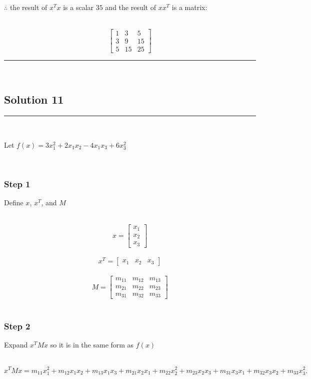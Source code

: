 \documentclass{article}
\begin{document}
\vspace{0.5cm}

\parbox{\textwidth}{$\therefore$ the result of $x^{T}x$ is a scalar $35$ and the result of $xx^{T}$ is a matrix:}\\
$$\begin{bmatrix} 1 & 3 & 5 \\ 3 & 9 & 15 \\ 5 & 15 & 25 \end{bmatrix}$$

\noindent\rule{\textwidth}{0.4pt}\\
\newpage

\subsection*{Solution 11}

\noindent\rule{\textwidth}{0.4pt}\\

\parbox{\textwidth}{Let $f(x) =  3x^2_1 +2x_1x_2 -4x_1x_3 +6x^2_3$}\\

\subsubsection*{Step 1}
\parbox{\textwidth}{Define $x$, $x^{T}$, and $M$}\\
$$x = \begin{bmatrix} x_1 \\ x_2 \\ x_3 \end{bmatrix}$$\\
$$x^{T} = \begin{bmatrix} x_1 & x_2 & x_3 \end{bmatrix}$$\\
$$M = \begin{bmatrix} m_{11} & m_{12} & m_{13} \\ m_{21} & m_{22} & m_{23} \\ m_{31} & m_{32} & m_{33} \end{bmatrix}$$\\
\subsubsection*{Step 2}

\parbox{\textwidth}{Expand $x^{T}Mx$ so it is in the same form as $f(x)$}\\

$$x^T M x = m_{11}x_1^2 + m_{12}x_1x_2 + m_{13}x_1x_3 + m_{21}x_2x_1 + m_{22}x_2^2 + m_{23}x_2x_3 + m_{31}x_3x_1 + m_{32}x_3x_2 + m_{33}x_3^2.$$
\end{document}

